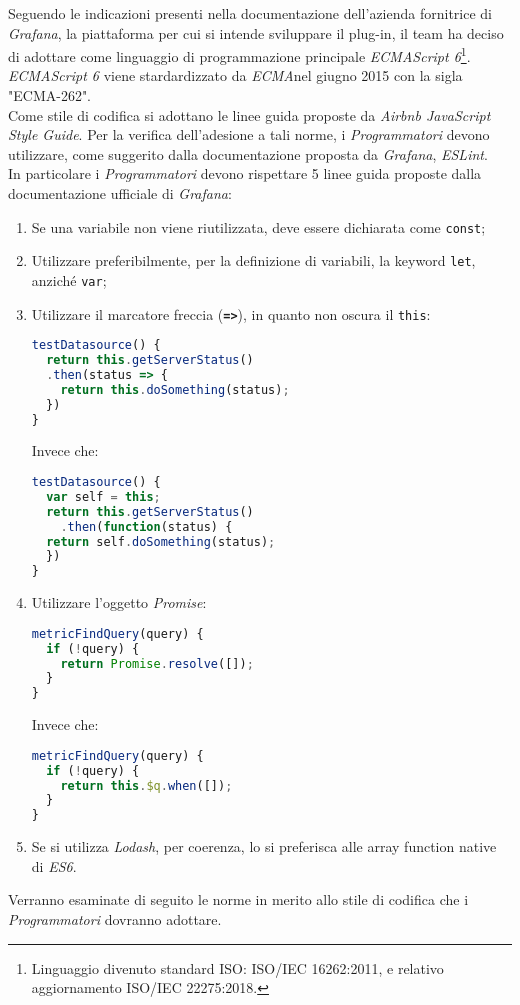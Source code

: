Seguendo le indicazioni presenti nella documentazione dell'azienda fornitrice di \textit{Grafana}, la piattaforma  per cui si intende sviluppare il plug-in, il team ha deciso di adottare come linguaggio di programmazione principale \textit{ECMAScript 6}\footnote{Linguaggio divenuto standard ISO: ISO/IEC 16262:2011, e relativo aggiornamento ISO/IEC 22275:2018.}.\\
\textit{ECMAScript 6} viene stardardizzato da \textit{ECMA}\glossario nel giugno 2015 con la sigla "ECMA-262".\\
Come stile di codifica si adottano le linee guida proposte da \textit{Airbnb JavaScript Style Guide}. Per la verifica dell'adesione a tali norme, i \textit{Programmatori} devono utilizzare, come suggerito dalla documentazione proposta da \textit{Grafana}, \textit{ESLint}\glossario.\\
In particolare i \textit{Programmatori} devono rispettare 5 linee guida proposte dalla documentazione ufficiale di \textit{Grafana}:
\begin{enumerate}
	\item Se una variabile non viene riutilizzata, deve essere dichiarata come \texttt{const};
	\item Utilizzare preferibilmente, per la definizione di variabili, la keyword  \texttt{let}, anziché  \texttt{var};
	\item Utilizzare il marcatore freccia (\texttt{\textbf{=>}}), in quanto non oscura il \texttt{this}:
	\begin{lstlisting}[language=JavaScript]
testDatasource() {
  return this.getServerStatus()
  .then(status => {
    return this.doSomething(status);
  })
}	
	\end{lstlisting}
	Invece che:
	\begin{lstlisting}[language=JavaScript]
testDatasource() {
  var self = this;
  return this.getServerStatus()
    .then(function(status) {
  return self.doSomething(status);
  })
}
	\end{lstlisting}
	\item Utilizzare l'oggetto \textit{Promise}:
	\begin{lstlisting}[language=JavaScript]
metricFindQuery(query) {
  if (!query) {
    return Promise.resolve([]);
  }
}	
	\end{lstlisting}
	Invece che:
	\begin{lstlisting}[language=JavaScript]
metricFindQuery(query) {
  if (!query) {
    return this.$q.when([]);
  }
}
	\end{lstlisting}
	\item Se si utilizza \textit{Lodash}\glossario, per coerenza, lo si preferisca alle array function native di \textit{ES6}.
\end{enumerate}
Verranno esaminate di seguito le norme in merito allo stile di codifica che i \textit{Programmatori} dovranno adottare.

